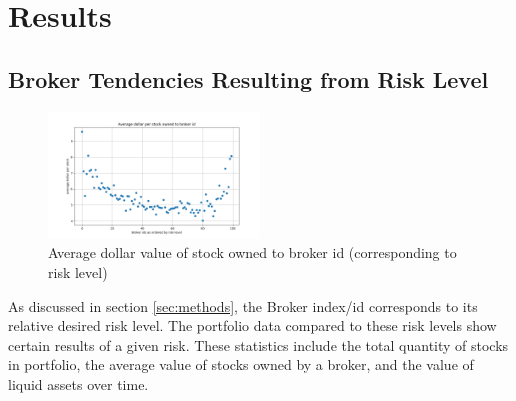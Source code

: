 \documentclass[letterpaper, 11 pt, proceedings]{IEEEtran}
\begin{document}
	\section{Results}\label{sec:results}
		
	
	\subsection{Broker Tendencies Resulting from Risk Level}\label{subsec:tendencies}	
	\begin{figure}[h]
		\centering
		\includegraphics[width=0.5\textwidth]{averageDollarPerStockToBrokerIds.png}
		\caption{Average dollar value of stock owned to broker id (corresponding to risk level)}
		\label{dollarValue}
	\end{figure}
	\FloatBarrier
	As discussed in section \ref{sec:methods}, the Broker index/id corresponds to its relative desired risk level. The portfolio data compared to these risk levels show certain results of a given risk. These statistics include the total quantity of stocks in portfolio, the average value of stocks owned by a broker, and the value of liquid assets over time.
		
\end{document}
